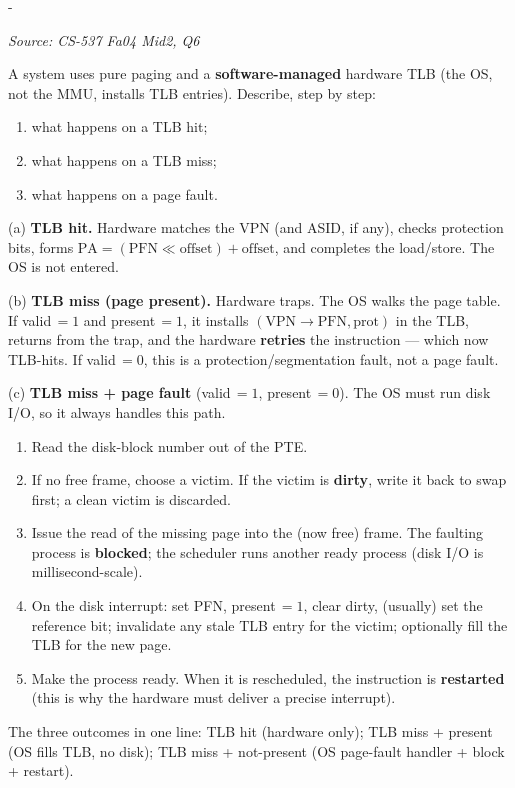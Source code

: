 \documentclass[11pt,a4paper]{article}
\makeatletter
\newcommand{\keepspace}[1]{\par\penalty-100\begingroup
  \setlength{\dimen@}{#1}\dimen@ii\pagegoal\advance\dimen@ii-\pagetotal
  \ifdim\dimen@>\dimen@ii\ifdim\dimen@ii>\z@\vfil\fi\break\fi\endgroup}
\newcounter{qn}[section]
\newenvironment{Qn}[4]{%
  \refstepcounter{qn}\keepspace{7\baselineskip}%
  \begin{tcolorbox}[qboxstyle, title={Q\thesection.\theqn\ \ [#1 \textbar\ #2]\ \ #4}]%
  {\footnotesize\color{g3}\textit{Source: #3}}\par\smallskip%
}{%
  \end{tcolorbox}%
}
\newenvironment{Sol}{%
  \begin{tcolorbox}[sboxstyle, title={Solution}]%
}{%
  \end{tcolorbox}\vspace{0.35em}%
}
\makeatother
\begin{document}
\begin{Qn}{Medium-Hard}{Lect 15}{CS-537 Fa04 Mid2, Q6}{TLB hit, TLB miss, and page-fault control flow}
A system uses pure paging and a \textbf{software-managed} hardware TLB
(the OS, not the MMU, installs TLB entries). Describe, step by step:
\begin{enumerate}
  \item[(a)] what happens on a TLB hit;
  \item[(b)] what happens on a TLB miss;
  \item[(c)] what happens on a page fault.
\end{enumerate}
\end{Qn}
\begin{Sol}
(a) \textbf{TLB hit.} Hardware matches the VPN (and ASID, if any), checks
protection bits, forms $\mathrm{PA}=(\mathrm{PFN}\ll\mathrm{offset})+\mathrm{offset}$,
and completes the load/store. The OS is not entered.

(b) \textbf{TLB miss (page present).} Hardware traps. The OS walks the page
table. If valid$\,=1$ and present$\,=1$, it installs
$(\mathrm{VPN}\to\mathrm{PFN},\mathrm{prot})$ in the TLB, returns from the
trap, and the hardware \textbf{retries} the instruction --- which now TLB-hits.
If valid$\,=0$, this is a protection/segmentation fault, not a page fault.

(c) \textbf{TLB miss + page fault} (valid$\,=1$, present$\,=0$). The OS
must run disk I/O, so it always handles this path.
\begin{enumerate}
  \item Read the disk-block number out of the PTE.
  \item If no free frame, choose a victim. If the victim is
        \textbf{dirty}, write it back to swap first; a clean victim is
        discarded.
  \item Issue the read of the missing page into the (now free) frame.
        The faulting process is \textbf{blocked}; the scheduler runs
        another ready process (disk I/O is millisecond-scale).
  \item On the disk interrupt: set PFN, present$\,=1$, clear dirty,
        (usually) set the reference bit; invalidate any stale TLB entry
        for the victim; optionally fill the TLB for the new page.
  \item Make the process ready. When it is rescheduled, the instruction
        is \textbf{restarted} (this is why the hardware must deliver a
        precise interrupt).
\end{enumerate}
The three outcomes in one line: TLB hit (hardware only);
TLB miss + present (OS fills TLB, no disk); TLB miss + not-present
(OS page-fault handler + block + restart).
\end{Sol}
\end{document}
